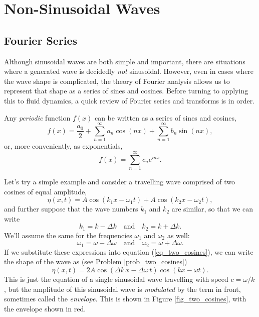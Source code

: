 \section{Non-Sinusoidal Waves}


\subsection{Fourier Series}

Although sinusoidal waves are both simple and important, there are situations where a generated wave is decidedly \emph{not} sinusoidal.  However, even in cases where the wave shape is complicated, the theory of Fourier analysis allows us to represent that shape as a series of sines and cosines.  Before turning to applying this to fluid dynamics, a quick review of Fourier series and transforms is in order.

Any \emph{periodic} function $f(x)$ can be written as a series of sines and cosines,
\[
f(x) = \frac{a_0}{2} + \sum_{n=1}^{\infty} a_n \cos(nx) +  \sum_{n=1}^{\infty} b_n \sin(nx),
\]
or, more conveniently, as exponentials,
\begin{equation}
f(x) = \sum_{n=1}^\infty c_n e^{inx}.
\end{equation}

Let's try a simple example and consider a travelling wave comprised of two cosines of equal amplitude,
\begin{equation}
\label{eq_two_cosines}
\eta(x, t) = A \cos(k_1 x - \omega_1 t) + A \cos(k_2 x - \omega_2 t),
\end{equation}
and further suppose that the wave numbers $k_1$ and $k_2$ are similar, so that we can write
\[
k_1 = k - \Delta k \quad \text{and} \quad k_2 = k + \Delta k.
\]
We'll assume the same for the frequencies $\omega_1$ and $\omega_2$ as well:
\[
\omega_1 = \omega - \Delta \omega \quad \text{and} \quad \omega_2 = \omega + \Delta \omega.
\]
If we substitute these expressions into equation (\ref{eq_two_cosines}), we can write the shape of the wave as (see Problem \ref{prob_two_cosines})
\begin{equation}
\eta(x, t) = 2A \cos(\Delta k \, x - \Delta \omega \, t) \cos(kx - \omega t).
\end{equation}
This is just the equation of a single sinusoidal wave travelling with speed $c = \omega/k$, but the amplitude of this sinusoidal wave is \emph{modulated} by the term in front, sometimes called the \emph{envelope}.  This is shown in Figure \ref{fig_two_cosines}, with the envelope shown in red.

